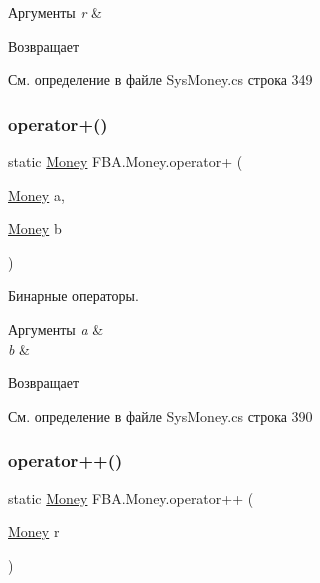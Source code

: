 \begin{DoxyParams}{Аргументы}
{\em r} & \\
\hline
\end{DoxyParams}
\begin{DoxyReturn}{Возвращает}

\end{DoxyReturn}


См. определение в файле Sys\+Money.\+cs строка 349

\mbox{\label{struct_f_b_a_1_1_money_a3320e7e7361f041f3e5cf86720276abc}} 
\subsubsection{\texorpdfstring{operator+()}{operator+()}\hspace{0.1cm}{\footnotesize\ttfamily [2/2]}}
{\footnotesize\ttfamily static \mbox{\hyperlink{struct_f_b_a_1_1_money}{Money}} F\+B\+A.\+Money.\+operator+ (\begin{DoxyParamCaption}\item[{\mbox{\hyperlink{struct_f_b_a_1_1_money}{Money}}}]{a,  }\item[{\mbox{\hyperlink{struct_f_b_a_1_1_money}{Money}}}]{b }\end{DoxyParamCaption})\hspace{0.3cm}{\ttfamily [static]}}



Бинарные операторы. 


\begin{DoxyParams}{Аргументы}
{\em a} & \\
\hline
{\em b} & \\
\hline
\end{DoxyParams}
\begin{DoxyReturn}{Возвращает}

\end{DoxyReturn}


См. определение в файле Sys\+Money.\+cs строка 390

\mbox{\label{struct_f_b_a_1_1_money_a37c9ebf2e52849c142606f8c2f9eb8ea}} 
\subsubsection{\texorpdfstring{operator++()}{operator++()}}
{\footnotesize\ttfamily static \mbox{\hyperlink{struct_f_b_a_1_1_money}{Money}} F\+B\+A.\+Money.\+operator++ (\begin{DoxyParamCaption}\item[{\mbox{\hyperlink{struct_f_b_a_1_1_money}{Money}}}]{r }\end{DoxyParamCaption})\hspace{0.3cm}{\ttfamily [static]}}




